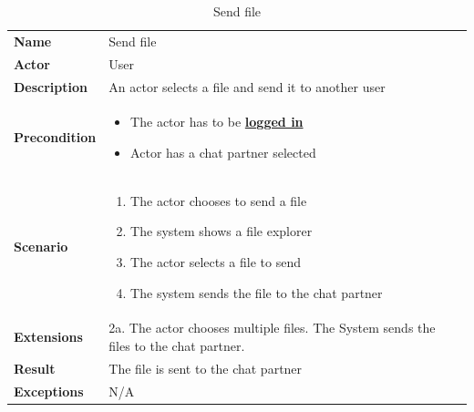 \begin{table}[ht]
    \caption{Send file}
    \begin{tabular}{|L{5cm}|L{10cm}|}
        \toprule
        \textbf{Name}        & Send file                                           \\
        \textbf{Actor}       & User                                                \\
        \textbf{Description} & An actor selects a file and send it to another user \\
        \textbf{Precondition} &
        \vspace{-0.75cm}
        \begin{itemize}
            \setlength\itemsep{-0.5em}
            \item The actor has to be \textbf{\hyperref[tab:table8]{logged in}}
            \item Actor has a chat partner selected
        \end{itemize} \\[-0.5cm]
        \textbf{Scenario} &
        \vspace{-0.75cm}
        \begin{enumerate}
            \setlength\itemsep{-0.5em}
            \item The actor chooses to send a file
            \item The system shows a file explorer
            \item The actor selects a file to send
            \item The system sends the file to the chat partner
        \end{enumerate} \\[-0.5cm]
        \textbf{Extensions} & 2a.
        The actor chooses multiple files.
        The System sends the files to the chat partner. \\
        \textbf{Result}      & The file is sent to the chat partner                \\
        \textbf{Exceptions}  & N/A                                                 \\
        \bottomrule
    \end{tabular}
    \label{tab:table19}
\end{table}

